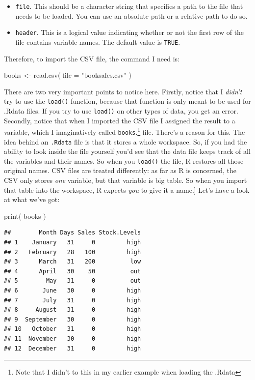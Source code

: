 \documentclass[
]{book}
\newenvironment{Shaded}{\begin{snugshade}}{\end{snugshade}}
\newcommand{\AttributeTok}[1]{\textcolor[rgb]{0.77,0.63,0.00}{#1}}
\newcommand{\FunctionTok}[1]{\textcolor[rgb]{0.00,0.00,0.00}{#1}}
\newcommand{\NormalTok}[1]{#1}
\newcommand{\OtherTok}[1]{\textcolor[rgb]{0.56,0.35,0.01}{#1}}
\newcommand{\StringTok}[1]{\textcolor[rgb]{0.31,0.60,0.02}{#1}}
\providecommand{\tightlist}{%
  \setlength{\itemsep}{0pt}\setlength{\parskip}{0pt}}
\begin{document}
\begin{itemize}
\tightlist
\item
  \texttt{file}. This should be a character string that specifies a path to the file that needs to be loaded. You can use an absolute path or a relative path to do so.
\item
  \texttt{header}. This is a logical value indicating whether or not the first row of the file contains variable names. The default value is \texttt{TRUE}.
\end{itemize}

Therefore, to import the CSV file, the command I need is:

\begin{Shaded}
\begin{Highlighting}[]
\NormalTok{books }\OtherTok{\textless{}{-}} \FunctionTok{read.csv}\NormalTok{( }\AttributeTok{file =} \StringTok{"booksales.csv"}\NormalTok{ )}
\end{Highlighting}
\end{Shaded}

There are two very important points to notice here. Firstly, notice that I \emph{didn't} try to use the \texttt{load()} function, because that function is only meant to be used for .Rdata files. If you try to use \texttt{load()} on other types of data, you get an error. Secondly, notice that when I imported the CSV file I assigned the result to a variable, which I imaginatively called \texttt{books}.\footnote{Note that I didn't to this in my earlier example when loading the .Rdata} file. There's a reason for this. The idea behind an \texttt{.Rdata} file is that it stores a whole workspace. So, if you had the ability to look inside the file yourself you'd see that the data file keeps track of all the variables and their names. So when you \texttt{load()} the file, R restores all those original names. CSV files are treated differently: as far as R is concerned, the CSV only stores \emph{one} variable, but that variable is big table. So when you import that table into the workspace, R expects \emph{you} to give it a name.{]} Let's have a look at what we've got:

\begin{Shaded}
\begin{Highlighting}[]
\FunctionTok{print}\NormalTok{( books )}
\end{Highlighting}
\end{Shaded}

\begin{verbatim}
##        Month Days Sales Stock.Levels
## 1    January   31     0         high
## 2   February   28   100         high
## 3      March   31   200          low
## 4      April   30    50          out
## 5        May   31     0          out
## 6       June   30     0         high
## 7       July   31     0         high
## 8     August   31     0         high
## 9  September   30     0         high
## 10   October   31     0         high
## 11  November   30     0         high
## 12  December   31     0         high
\end{verbatim}
\end{document}
